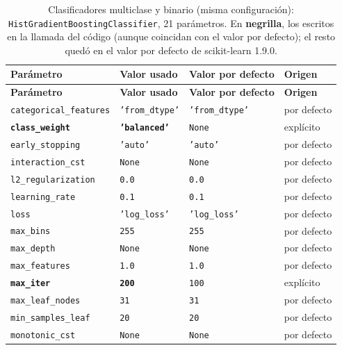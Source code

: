 \documentclass[11pt,a4paper]{article}
\renewcommand{\arraystretch}{1.15}
\begin{document}
{\footnotesize\renewcommand{\arraystretch}{1.05}
\begin{longtable}{L{3.9cm} L{3.7cm} L{3.0cm} L{2.4cm}}
\caption{Clasificadores multiclase y binario (misma configuración): \texttt{HistGradientBoostingClassifier}, 21 parámetros. En \textbf{negrilla}, los escritos en la llamada del código (aunque coincidan con el valor por defecto); el resto quedó en el valor por defecto de scikit-learn 1.9.0.}\label{tab:param-hgb}\\
\toprule
\textbf{Parámetro} & \textbf{Valor usado} & \textbf{Valor por defecto} & \textbf{Origen} \\
\midrule
\endfirsthead
\toprule
\textbf{Parámetro} & \textbf{Valor usado} & \textbf{Valor por defecto} & \textbf{Origen} \\
\midrule
\endhead
\bottomrule
\endfoot
\texttt{categorical\_features} & \texttt{'from\_dtype'} & \texttt{'from\_dtype'} & por defecto \\
\textbf{\texttt{class\_weight}} & \textbf{\texttt{'balanced'}} & \texttt{None} & explícito \\
\texttt{early\_stopping} & \texttt{'auto'} & \texttt{'auto'} & por defecto \\
\texttt{interaction\_cst} & \texttt{None} & \texttt{None} & por defecto \\
\texttt{l2\_regularization} & \texttt{0.0} & \texttt{0.0} & por defecto \\
\texttt{learning\_rate} & \texttt{0.1} & \texttt{0.1} & por defecto \\
\texttt{loss} & \texttt{'log\_loss'} & \texttt{'log\_loss'} & por defecto \\
\texttt{max\_bins} & \texttt{255} & \texttt{255} & por defecto \\
\texttt{max\_depth} & \texttt{None} & \texttt{None} & por defecto \\
\texttt{max\_features} & \texttt{1.0} & \texttt{1.0} & por defecto \\
\textbf{\texttt{max\_iter}} & \textbf{\texttt{200}} & \texttt{100} & explícito \\
\texttt{max\_leaf\_nodes} & \texttt{31} & \texttt{31} & por defecto \\
\texttt{min\_samples\_leaf} & \texttt{20} & \texttt{20} & por defecto \\
\texttt{monotonic\_cst} & \texttt{None} & \texttt{None} & por defecto \\

\end{longtable}}
\end{document}
